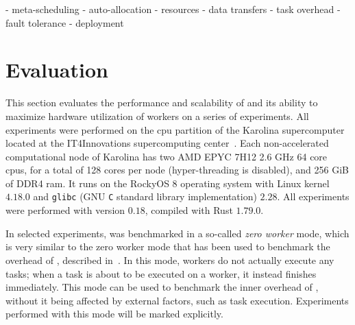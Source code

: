 
- meta-scheduling
- auto-allocation
- resources
- data transfers
- task overhead
- fault tolerance
- deployment

\section{Evaluation}
\label{hq:evaluation}
This section evaluates the performance and scalability of \hyperqueue{} and its ability
to maximize hardware utilization of workers on a series of experiments. All experiments were
performed on the \gls{cpu} partition of the Karolina
supercomputer~\cite{karolina} located at the IT4Innovations supercomputing
center~\cite{it4i}. Each non-accelerated computational node of Karolina has two AMD
EPYC\texttrademark{} 7H12 2.6 GHz 64 core \glspl{cpu}, for a total of 128 cores
per node (hyper-threading is disabled), and 256 GiB of DDR4 \gls{ram}. It runs on the
RockyOS 8 operating system with Linux kernel $4.18.0$ and \texttt{glibc} (GNU \texttt{C} standard library implementation)
$2.28$. All experiments were performed with \hyperqueue{} version
$0.18$, compiled with Rust $1.79.0$.

In selected experiments, \hq{} was benchmarked in a so-called
\emph{zero worker} mode, which is very similar to the zero worker mode that has been used to
benchmark the overhead of \rsds{}, described in~. In this
mode, workers do not actually execute any tasks; when a task is about to be executed on a worker,
it instead finishes immediately. This mode can be used to benchmark the inner overhead of
\hyperqueue{}, without it being affected by external factors, such as task execution.
Experiments performed with this mode will be marked explicitly.

